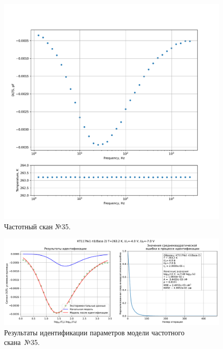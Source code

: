 \begin{figure}[!ht]
    \centering
    \includegraphics[width=1\textwidth]{../plots/КТ117№1_п1(база 2)_2500Гц-1Гц_1пФ_-10С_-4В-7В_50мВ_20мкс_шаг_0,1.pdf}
    \caption{Частотный скан №35.}
    \label{pic:frequency_scan_35}
\end{figure}

\begin{figure}[!ht]
    \centering
    \includegraphics[width=1\textwidth]{../plots/КТ117№1_п1(база 2)_2500Гц-1Гц_1пФ_-10С_-4В-7В_50мВ_20мкс_шаг_0,1_model.pdf}
    \caption{Результаты идентификации параметров модели частотного скана~№35.}
    \label{pic:frequency_scan_model35}
\end{figure}

\pagebreak


